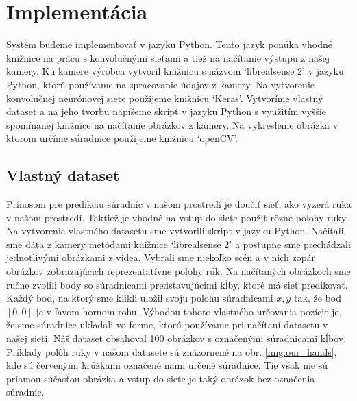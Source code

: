 \section{Implementácia}\label{sec:implementation}
Systém budeme implementovať v jazyku Python. Tento jazyk ponúka vhodné knižnice na prácu s konvolučnými sieťami a tiež na načítanie výstupu z našej kamery. Ku kamere výrobca vytvoril knižnicu s názvom `librealsense 2' v jazyku Python, ktorú používame na spracovanie údajov z kamery. Na vytvorenie konvolučnej neurónovej siete použijeme knižnicu `Keras'. Vytvoríme vlastný dataset a na jeho tvorbu napíšeme skript v jazyku Python s využitím vyššie spomínanej knižnice na načítanie obrázkov z kamery. Na vykreslenie obrázka v ktorom určíme súradnice použijeme knižnicu `openCV'.

\subsection{Vlastný dataset}
Prínosom pre predikciu súradníc v našom prostredí je doučiť sieť, ako vyzerá ruka v našom prostredí. Taktiež je vhodné na vstup do siete použiť rôzne polohy ruky. Na vytvorenie vlastného datasetu sme vytvorili skript v jazyku Python. Načítali sme dáta z kamery metódami knižnice `librealsense 2' a postupne sme prechádzali jednotlivými obrázkami z videa. Vybrali sme niekoľko scén a v nich zopár obrázkov zobrazujúcich reprezentatívne polohy rúk. Na načítaných obrázkoch sme ručne zvolili body so súradnicami predstavujúcimi kĺby, ktoré má sieť predikovať. Každý bod, na ktorý sme klikli uložil svoju polohu súradnicami $x, y$ tak, že bod $\left[0, 0\right]$ je v ľavom hornom rohu. Výhodou tohoto vlastného určovania pozície je, že sme súradnice ukladali vo forme, ktorú používame pri načítaní datasetu v našej sieti. Náš dataset obsahoval 100 obrázkov s označenými súradnicami kĺbov. Príklady polôh ruky v našom datasete sú znázornené na obr. \ref{img:our_hands}, kde sú červenými krúžkami označené nami určené súradnice. Tie však nie sú priamou súčasťou obrázka a vstup do siete je taký obrázok bez označenia súradníc.

